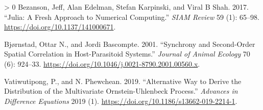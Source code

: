 \documentclass{article}
\newlength{\cslhangindent}
\newenvironment{CSLReferences}[3] %
 {%
  \setlength{\parindent}{0pt}
  \ifodd #1 \everypar{\setlength{\hangindent}{\cslhangindent}}\ignorespaces\fi
  \ifnum #2 > 0
  \setlength{\parskip}{#2\baselineskip}
  \fi
 }%
 {}
\begin{document}
\hypertarget{refs}{}
\begin{CSLReferences}{1}{0}
\leavevmode\hypertarget{ref-Julia-2017}{}%
Bezanson, Jeff, Alan Edelman, Stefan Karpinski, and Viral B Shah. 2017.
{``Julia: A Fresh Approach to Numerical Computing.''} \emph{SIAM
{R}eview} 59 (1): 65--98. \url{https://doi.org/10.1137/141000671}.

\leavevmode\hypertarget{ref-Bjrnstad2001}{}%
Bjørnstad, Ottar N., and Jordi Bascompte. 2001. {``Synchrony and
Second-Order Spatial Correlation in Host-Parasitoid Systems.''}
\emph{Journal of Animal Ecology} 70 (6): 924--33.
\url{https://doi.org/10.1046/j.0021-8790.2001.00560.x}.

\leavevmode\hypertarget{ref-Vatiwutipong2019}{}%
Vatiwutipong, P., and N. Phewchean. 2019. {``Alternative Way to Derive
the Distribution of the Multivariate Ornstein-Uhlenbeck Process.''}
\emph{Advances in Difference Equations} 2019 (1).
\url{https://doi.org/10.1186/s13662-019-2214-1}.

\end{CSLReferences}



\end{document}
